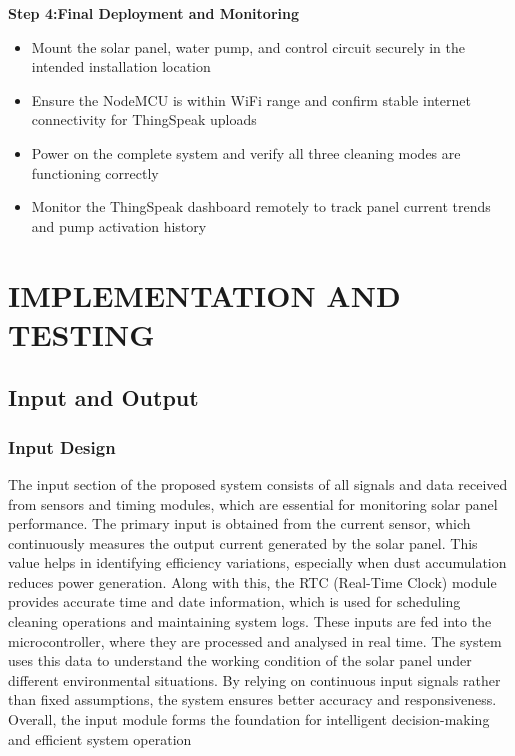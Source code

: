 \documentclass[10pt]{report}
\begin{document}
\begin{sloppypar}
{{{\begin{sloppypar}
\begin{itemize}
\end{itemize}
\textbf{Step 4:Final Deployment and Monitoring}
\hspace{0.5cm}
\begin{itemize}
    \item Mount the solar panel, water pump, and control circuit securely in the intended
installation location
    \item Ensure the NodeMCU is within WiFi range and confirm stable internet connectivity for ThingSpeak uploads
    \item Power on the complete system and verify all three cleaning modes are functioning correctly
    \item Monitor the ThingSpeak dashboard remotely to track panel current trends and
pump activation history
\end{itemize}

\chapter{IMPLEMENTATION AND TESTING}
\linespread{1.5}
\section{Input and Output}
\subsection{Input Design}
\hspace{0.5cm}
The input section of the proposed system consists of all signals and data received
from sensors and timing modules, which are essential for monitoring solar panel
performance. The primary input is obtained from the current sensor, which continuously measures the output current generated by the solar panel. This value helps in
identifying efficiency variations, especially when dust accumulation reduces power
generation. Along with this, the RTC (Real-Time Clock) module provides accurate
time and date information, which is used for scheduling cleaning operations and
maintaining system logs. These inputs are fed into the microcontroller, where they
are processed and analysed in real time. The system uses this data to understand the
working condition of the solar panel under different environmental situations. By relying on continuous input signals rather than fixed assumptions, the system ensures
better accuracy and responsiveness. Overall, the input module forms the foundation
for intelligent decision-making and efficient system operation

\end{sloppypar}}}}
\end{sloppypar}
\end{document}
